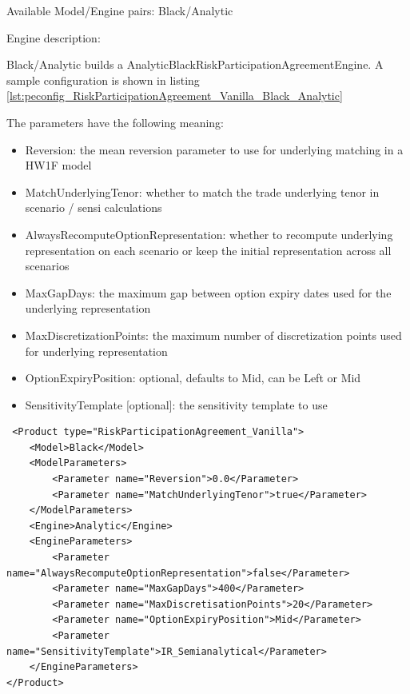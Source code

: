 Available Model/Engine pairs: Black/Analytic

Engine description:

Black/Analytic builds a AnalyticBlackRiskParticipationAgreementEngine. A sample configuration is shown in listing
\ref{lst:peconfig_RiskParticipationAgreement_Vanilla_Black_Analytic}

The parameters have the following meaning:

\begin{itemize}
\item Reversion: the mean reversion parameter to use for underlying matching in a HW1F model
\item MatchUnderlyingTenor: whether to match the trade underlying tenor in scenario / sensi calculations
\item AlwaysRecomputeOptionRepresentation: whether to recompute underlying representation on each scenario or keep the initial representation across all scenarios
\item MaxGapDays: the maximum gap between option expiry dates used for the underlying representation
\item MaxDiscretizationPoints: the maximum number of discretization points used for underlying representation
\item OptionExpiryPosition: optional, defaults to Mid, can be Left or Mid
\item SensitivityTemplate [optional]: the sensitivity template to use
\end{itemize}

\begin{longlisting}
\begin{verbatim}
 <Product type="RiskParticipationAgreement_Vanilla">
    <Model>Black</Model>
    <ModelParameters>
        <Parameter name="Reversion">0.0</Parameter>
        <Parameter name="MatchUnderlyingTenor">true</Parameter>
    </ModelParameters>
    <Engine>Analytic</Engine>
    <EngineParameters>
        <Parameter name="AlwaysRecomputeOptionRepresentation">false</Parameter>
        <Parameter name="MaxGapDays">400</Parameter>
        <Parameter name="MaxDiscretisationPoints">20</Parameter>
        <Parameter name="OptionExpiryPosition">Mid</Parameter>
        <Parameter name="SensitivityTemplate">IR_Semianalytical</Parameter>
    </EngineParameters>
</Product>
\end{verbatim}
\caption{Configuration for Product RiskParticipationAgreement\_Vanilla, Model Black, Engine Analytic}
\label{lst:peconfig_RiskParticipationAgreement_Vanilla_Black_Analytic}
\end{longlisting}

